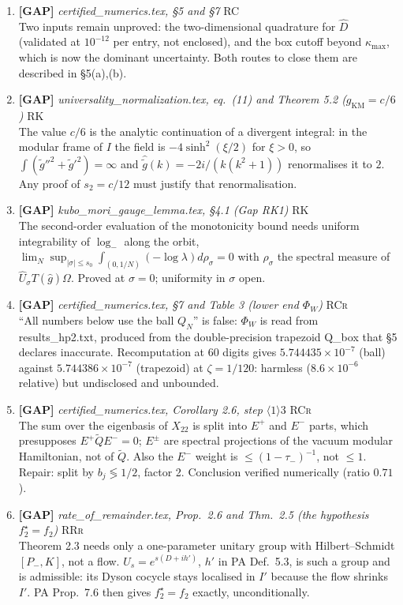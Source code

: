 \documentclass[11pt]{article}
\begin{document}
\begin{enumerate}[leftmargin=1.6em,itemsep=6pt]
\item \textbf{[GAP]} \emph{certified\_numerics.tex, \S5 and \S7} \hfill\textsc{RC}\\ Two inputs remain unproved: the two-dimensional quadrature for $\widehat D$ (validated at $10^{-12}$ per entry, not enclosed), and the box cutoff beyond $\kappa_{\max}$, which is now the dominant uncertainty. Both routes to close them are described in \S5(a),(b).
\item \textbf{[GAP]} \emph{universality\_normalization.tex, eq.~(11) and Theorem 5.2 ($g_{\mathrm{KM}}=c/6$)} \hfill\textsc{RK}\\ The value $c/6$ is the analytic continuation of a divergent integral: in the modular frame of $I$ the field is $-4\sinh^2(\xi/2)$ for $\xi>0$, so $\int(\tilde g''^2+\tilde g'^2)=\infty$ and $\hat{\tilde g}(k)=-2i/(k(k^2+1))$ renormalises it to $2$. Any proof of $s_2=c/12$ must justify that renormalisation.
\item \textbf{[GAP]} \emph{kubo\_mori\_gauge\_lemma.tex, \S4.1 (Gap RK1)} \hfill\textsc{RK}\\ The second-order evaluation of the monotonicity bound needs uniform integrability of $\log_-$ along the orbit, $\lim_N\sup_{\lvert\sigma\rvert\le s_0}\int_{(0,1/N)}(-\log\lambda)d\rho_\sigma=0$ with $\rho_\sigma$ the spectral measure of $\hat U_\sigma T(\hat g)\Omega$. Proved at $\sigma=0$; uniformity in $\sigma$ open.
\item \textbf{[GAP]} \emph{certified\_numerics.tex, \S7 and Table 3 (lower end $\Phi_W$)} \hfill\textsc{RCr}\\ ``All numbers below use the ball $Q_N$'' is false: $\Phi_W$ is read from results\_hp2.txt, produced from the double-precision trapezoid Q\_box that \S5 declares inaccurate. Recomputation at 60 digits gives $5.744435\times10^{-7}$ (ball) against $5.744386\times10^{-7}$ (trapezoid) at $\zeta=1/120$: harmless ($8.6\times10^{-6}$ relative) but undisclosed and unbounded.
\item \textbf{[GAP]} \emph{certified\_numerics.tex, Corollary 2.6, step $\langle1\rangle3$} \hfill\textsc{RCr}\\ The sum over the eigenbasis of $X_{22}$ is split into $E^{+}$ and $E^{-}$ parts, which presupposes $E^{+}\widetilde QE^{-}=0$; $E^{\pm}$ are spectral projections of the vacuum modular Hamiltonian, not of $\widetilde Q$. Also the $E^{-}$ weight is $\le(1-\tau_-)^{-1}$, not $\le1$. Repair: split by $b_j\lessgtr1/2$, factor 2. Conclusion verified numerically (ratio $0.71$).
\item \textbf{[GAP]} \emph{rate\_of\_remainder.tex, Prop.\ 2.6 and Thm.\ 2.5 (the hypothesis $f_2^\star=f_2$)} \hfill\textsc{RRr}\\ Theorem 2.3 needs only a one-parameter unitary group with Hilbert--Schmidt $[P_-,K]$, not a flow. $U_s=e^{s(D+ih')}$, $h'$ in PA Def.\ 5.3, is such a group and is admissible: its Dyson cocycle stays localised in $I'$ because the flow shrinks $I'$. PA Prop.\ 7.6 then gives $f_2^\star=f_2$ exactly, unconditionally.

\end{enumerate}
\end{document}
